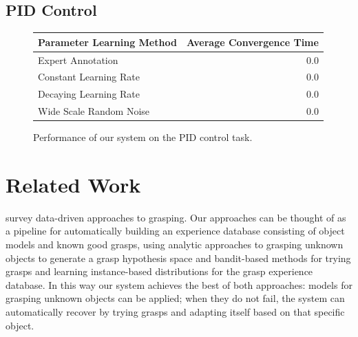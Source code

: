 \documentclass[conference]{IEEEtran}
\begin{document}
\subsection{PID Control}

\begin{figure}
  \begin{center}
  \begin{tabular}{lr}
    \toprule
  Parameter Learning Method & Average Convergence Time \\ 
  \midrule
  Expert Annotation & 0.0 \\ 
  Constant Learning Rate & 0.0 \\
  Decaying Learning Rate & 0.0 \\
  Wide Scale Random Noise & 0.0 \\
  \bottomrule
  \end{tabular}
  \caption{Performance of our system on the PID control task.}
  \end{center}
\end{figure}




\section{Related Work}

\citet{bohg13} survey data-driven approaches to grasping.  Our
approaches can be thought of as a pipeline for automatically building
an experience database consisting of object models and known good
grasps, using analytic approaches to grasping unknown objects to
generate a grasp hypothesis space and bandit-based methods for trying
grasps and learning instance-based distributions for the grasp
experience database.  In this way our system achieves the best of both
approaches: models for grasping unknown objects can be applied; when
they do not fail, the system can automatically recover by trying
grasps and adapting itself based on that specific object. 
\end{document}
